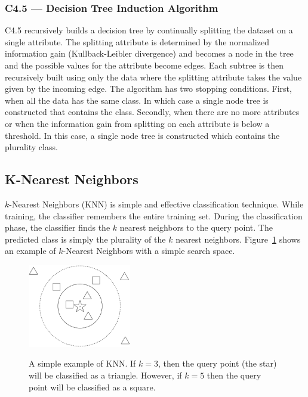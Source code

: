 \documentclass[12pt]{ucthesis}
\newcommand{\captionfonts}{\small\bf\ssp}
\begin{document}
\subsubsection{C4.5 --- Decision Tree Induction Algorithm}
\label{background-classification-classifiers-j48-c45}
C4.5 recursively builds a decision tree by continually splitting the dataset on a single attribute\cite{Quinlan}.
The splitting attribute is determined by the normalized information gain (Kullback-Leibler divergence) and becomes a
node in the tree and the possible values for the attribute become edges. Each subtree is then recursively built using only the
data where the splitting attribute takes the value given by the incoming edge. The algorithm has two stopping conditions.
First, when all the data has the same class. In which case a single node tree is constructed that contains the class.
Secondly, when there are no more attributes or when the information gain from splitting on each attribute is below a threshold.
In this case, a single node tree is constructed which contains the plurality class.

\subsection{K-Nearest Neighbors}
\label{background-classification-classifiers-knn}
$k$-Nearest Neighbors (KNN) is simple and effective classification technique\cite{Duda}.
While training, the classifier remembers the entire training set.
During the classification phase, the classifier finds the $k$ nearest neighbors
to the query point. The predicted class is simply the plurality of the $k$ nearest neighbors.
Figure~\ref{fig:knn} shows an example of $k$-Nearest Neighbors with a simple search space.

\begin{figure}
   \begin{center}
      \includegraphics[width=0.4\textwidth]{images/KNN.eps}
      \captionfonts
      \caption[K-Nearest Neighbors]{A simple example of KNN. If $k = 3$, then the query point (the star) will be classified as a triangle. However, if $k = 5$ then the query point will be classified as a square.}
      \label{fig:knn}
   \end{center}
\end{figure}
\end{document}
